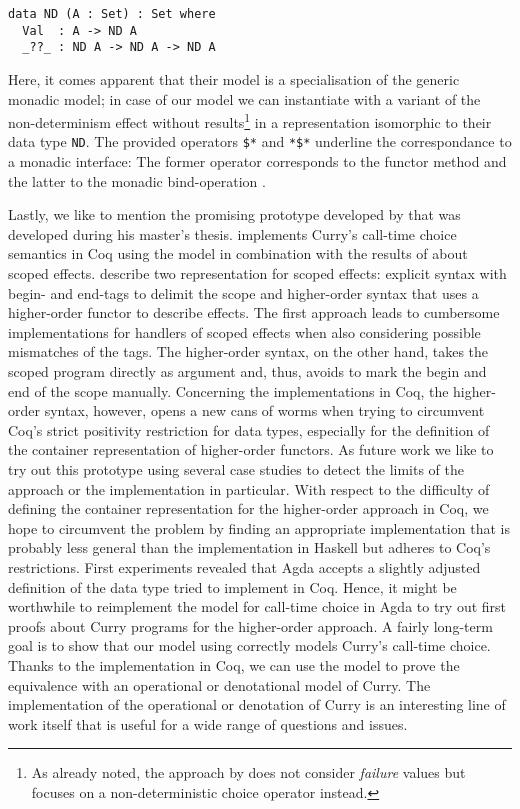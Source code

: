 \begin{verbatim}
data ND (A : Set) : Set where
  Val  : A -> ND A
  _??_ : ND A -> ND A -> ND A
\end{verbatim}

Here, it comes apparent that their model is a specialisation of the generic monadic model; in case of our model we can instantiate  with a variant of the non\--determinism effect  without  results\footnote{As already noted, the approach by \citeauthor{antoy2017proving} does not consider \emph{failure} values but focuses on a non\--deterministic choice operator instead.} in a representation isomorphic to their data type \texttt{ND}.
The provided operators \texttt{\$*} and \texttt{*\$*} underline the correspondance to a monadic interface: The former operator corresponds to the functor method  and the latter to the monadic bind\--operation \hinl{>>=}.

Lastly, we like to mention the promising prototype developed by \citet{bunkenburg2019modeling} that was developed during his master's thesis.
\citeauthor{bunkenburg2019modeling} implements Curry's call\--time choice semantics in Coq using the  model in combination with the results of \citet{wu2014effect} about scoped effects.
\citeauthor{wu2014effect} describe two representation for scoped effects: explicit syntax with begin\-- and end\--tags to delimit the scope and higher\--order syntax that uses a higher\--order functor to describe effects.
The first approach leads to cumbersome implementations for handlers of scoped effects when also considering possible mismatches of the tags.
The higher\--order syntax, on the other hand, takes the scoped program directly as argument and, thus, avoids to mark the begin and end of the scope manually.
Concerning the implementations in Coq, the higher\--order syntax, however, opens a new cans of worms when trying to circumvent Coq's strict positivity restriction for data types, especially for the definition of the container representation of higher\--order functors.
As future work we like to try out this prototype using several case studies to detect the limits of the approach or the implementation in particular.
With respect to the difficulty of defining the container representation for the higher\--order approach in Coq, we hope to circumvent the problem by finding an appropriate implementation that is probably less general than the implementation in Haskell but
adheres to Coq's restrictions.
First experiments revealed that Agda accepts a slightly adjusted definition of the data type \citeauthor{bunkenburg2019modeling} tried to implement in Coq.
Hence, it might be worthwhile to reimplement the model for call\--time choice in Agda to try out first proofs about Curry programs for the higher\--order approach.
A fairly long\--term goal is to show that our model using  correctly models Curry's call\--time choice.
Thanks to the implementation in Coq, we can use the model to prove the equivalence with an operational or denotational model of Curry.
The implementation of the operational or denotation of Curry is an interesting line of work itself that is useful for a wide range of questions and issues.

